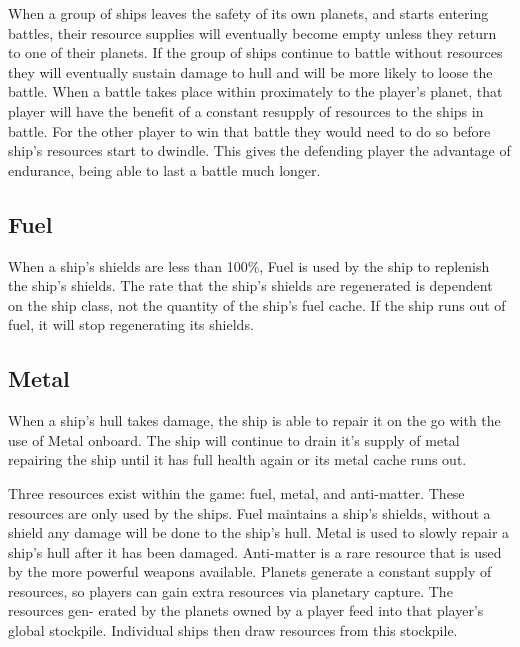 When a group of ships leaves the safety of its own planets, and starts entering battles, their resource supplies will eventually become empty unless they return to one of their planets. 
If the group of ships continue to battle without resources they will eventually sustain damage to hull and will be more likely to loose the battle.
When a battle takes place within proximately to the player's planet, that player will have the benefit of a constant resupply of resources to the ships in battle. For the other player to win that battle they would need to do so before ship's resources start to dwindle.
This gives the defending player the advantage of endurance, being able to last a battle much longer.


\subsection{Fuel}
When a ship's shields are less than 100\%, Fuel is used by the ship to replenish the ship's shields.
The rate that the ship's shields are regenerated is dependent on the ship class, not the quantity of the ship's fuel cache.
If the ship runs out of fuel, it will stop regenerating its shields.


\subsection{Metal}
When a ship's hull takes damage, the ship is able to repair it on the go with the use of Metal onboard.
The ship will continue to drain it's supply of metal repairing the ship until it has full health again or its metal cache runs out.





Three resources exist within the game: fuel, metal, and anti-matter. These resources are only used by the ships. Fuel maintains a ship’s shields, without a shield any damage will be done to the ship’s hull. Metal is used to slowly repair a ship’s hull after it has been damaged. Anti-matter is a rare resource that is used by the more powerful weapons available.
Planets generate a constant supply of resources, so players can gain extra resources via planetary capture. The resources gen- erated by the planets owned by a player feed into that player’s global stockpile. Individual ships then draw resources from this stockpile.